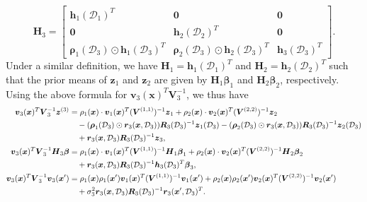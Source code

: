 \documentclass[12pt]{article}
\newcommand{\bs}[1]{\boldsymbol{#1}}
\newcommand{\cbl}[1]{{\color{black}{#1}}}
\begin{document}
\begin{equation*}
    \bs{H}_3 = \begin{bmatrix}
        \bs{h}_1(\mathcal{D}_1)^T & \bs{0} & \bs{0}\\
        \bs{0} & \bs{h}_2(\mathcal{D}_2)^T & \bs{0}\\
        \bs{\rho}_1(\mathcal{D}_3)\odot \bs{h}_1(\mathcal{D}_3)^T & \bs{\rho}_2(\mathcal{D}_3)\odot \bs{h}_2(\mathcal{D}_3)^T & \bs{h}_3(\mathcal{D}_3)^T
    \end{bmatrix}.
\end{equation*}
Under a similar definition, we have $\bs{H}_1 = \bs{h}_1(\mathcal{D}_1)^T$ and $\bs{H}_2=\bs{h}_2(\mathcal{D}_2)^T$ such that the prior means of $\bs{z}_1$ and $\bs{z}_2$ are given by $\bs{H}_1\bs{\beta}_1$ and $\bs{H}_2\bs{\beta}_2$, respectively. Using the above formula for $\bs{v}_3(\bs{x})^T\bs{V}_3^{-1}$, we thus have
\begin{align*}
    \bs{v}_3(\bs{x})^T\bs{V}_3^{-1}\bs{z}^{(3)} &= \rho_1(\bs{x})\cdot \bs{v}_1(\bs{x})^T(\bs{V}^{(1,1)})^{-1}\bs{z}_1 + \rho_2(\bs{x})\cdot \bs{v}_2(\bs{x})^T(\bs{V}^{(2,2)})^{-1}\bs{z}_2\\
    &\quad - (\bs{\rho}_1(\mathcal{D}_3)\odot \bs{r}_3(\bs{x},\mathcal{D}_3))\bs{R}_3(\mathcal{D}_3)^{-1}\bs{z}_1(\mathcal{D}_3) - (\bs{\rho}_2(\mathcal{D}_3)\odot \bs{r}_3(\bs{x},\mathcal{D}_3))\bs{R}_3(\mathcal{D}_3)^{-1}\bs{z}_2(\mathcal{D}_3)\\
    &\quad + \bs{r}_3(\bs{x},\mathcal{D}_3)\bs{R}_3(\mathcal{D}_3)^{-1}\bs{z}_3,\\
    \bs{v}_3(\bs{x})^T\bs{V}_3^{-1}\bs{H}_3\bs{\beta} &= \rho_1(\bs{x})\cdot \bs{v}_1(\bs{x})^T(\bs{V}^{(1,1)})^{-1}\bs{H}_1\bs{\beta}_1 + \rho_2(\bs{x})\cdot \bs{v}_2(\bs{x})^T(\bs{V}^{(2,2)})^{-1}\bs{H}_2\bs{\beta}_2\\
    &\quad + \bs{r}_3(\bs{x},\mathcal{D}_3)\bs{R}_3(\mathcal{D}_3)^{-1}\bs{h}_3(\mathcal{D}_3)^T\bs{\beta}_3,\\
    \bs{v}_3(\bs{x})^T\bs{V}_3^{-1}\bs{v}_3(\cbl{\bs{x}'}) &= \cbl{\rho_1(\bs{x})\rho_1(\bs{x}')}\bs{v}_1(\bs{x})^T(\bs{V}^{(1,1)})^{-1}\bs{v}_1(\cbl{\bs{x}'}) + \cbl{\rho_2(\bs{x})\rho_2(\bs{x}')}\bs{v}_2(\bs{x})^T(\bs{V}^{(2,2)})^{-1}\bs{v}_2(\cbl{\bs{x}'})\\
    &\quad + \sigma_3^2\bs{r}_3(\bs{x},\mathcal{D}_3)\bs{R}_3(\mathcal{D}_3)^{-1}\bs{r}_3(\cbl{\bs{x}'},\mathcal{D}_3)^T.
\end{align*}

\cbl{We then derive the means and variances for the r-GMGP model (equations (8) in the main paper).}
\end{document}
